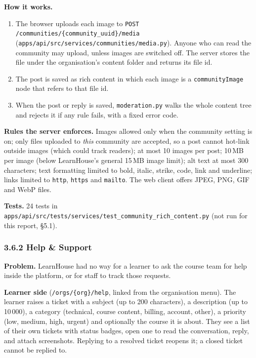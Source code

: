 \documentclass[11pt,a4paper]{article}
\newcommand{\fp}[1]{\nolinkurl{#1}}
\begin{document}
\textbf{How it works.}
\begin{enumerate}
  \item The browser uploads each image to \texttt{POST /communities/\{community\_uuid\}/media}
        (\fp{apps/api/src/services/communities/media.py}). Anyone who can read the community may upload,
        unless images are switched off. The server stores the file under the organisation's content
        folder and returns its file id.
  \item The post is saved as rich content in which each image is a \texttt{communityImage} node that
        refers to that file id.
  \item When the post or reply is saved, \fp{moderation.py} walks the whole content tree and rejects it
        if any rule fails, with a fixed error code.
\end{enumerate}

\textbf{Rules the server enforces.} Images allowed only when the community setting is on; only files
uploaded to \emph{this} community are accepted, so a post cannot hot-link outside images (which could
track readers); at most 10 images per post; 10\,MB per image (below LearnHouse's general 15\,MB image
limit); alt text at most 300 characters; text formatting limited to bold, italic, strike, code, link
and underline; links limited to \texttt{http}, \texttt{https} and \texttt{mailto}. The web client offers
JPEG, PNG, GIF and WebP files.

\textbf{Tests.} 24 tests in \fp{apps/api/src/tests/services/test_community_rich_content.py}
(not run for this report, §5.1).

\subsubsection*{3.6.2 Help \& Support}
\textbf{Problem.} LearnHouse had no way for a learner to ask the course team for help inside the
platform, or for staff to track those requests.

\textbf{Learner side} (\texttt{/orgs/\{org\}/help}, linked from the organisation menu). The learner raises a ticket with a subject (up to 200 characters), a description (up to 10\,000),
a category (technical, course content, billing, account, other), a priority (low, medium, high,
urgent) and optionally the course it is about. They see a list of their own tickets with status
badges, open one to read the conversation, reply, and attach screenshots. Replying to a resolved ticket
reopens it; a closed ticket cannot be replied to.
\end{document}
